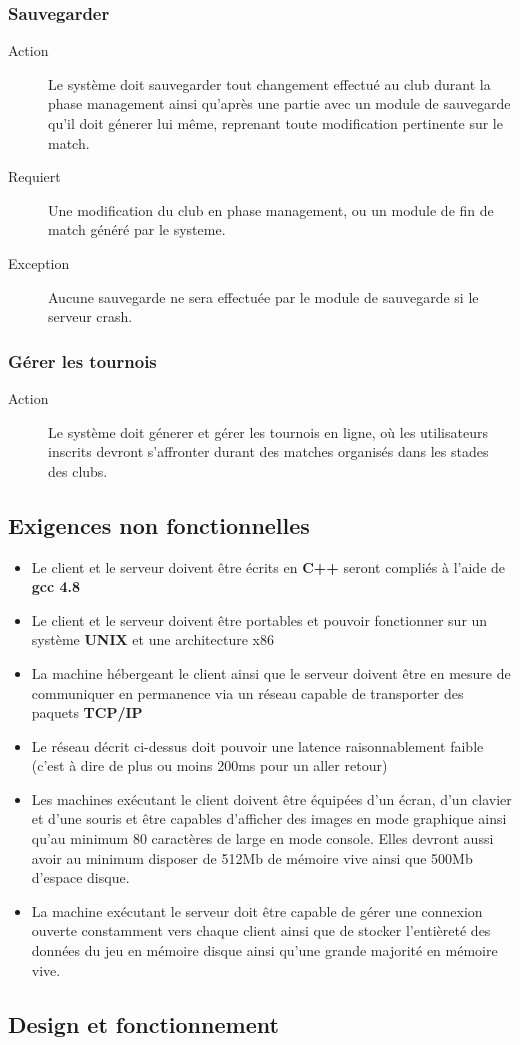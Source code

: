 \documentclass[a4paper]{article}
\begin{document}
\subsubsection{Sauvegarder}
\begin{description}
\item[Action] Le système doit sauvegarder tout changement effectué au \gls{club} durant la phase management ainsi qu'après une partie avec un module de sauvegarde qu'il doit génerer lui même, reprenant toute modification pertinente sur le match.
\item[Requiert] Une modification du club en phase management, ou un module de fin de match généré par le systeme. 
\item[Exception] Aucune sauvegarde ne sera effectuée par le module de sauvegarde si le serveur crash.
\end{description}

\subsubsection{Gérer les tournois}
\begin{description}
\item[Action] Le système doit génerer et gérer les tournois en ligne, où les utilisateurs inscrits devront s'affronter durant des matches organisés dans les stades des clubs.
\end{description}


\subsection{Exigences non fonctionnelles}
\label{enf}
\begin{itemize}
\item Le client et le serveur doivent être écrits en \textbf{C++} seront compliés à l'aide de \textbf{gcc 4.8}
\item Le client et le serveur doivent être portables et pouvoir fonctionner sur un système \textbf{UNIX} et une architecture x86
\item La machine hébergeant le client ainsi que le serveur doivent être en mesure de communiquer en permanence via un réseau capable de transporter des paquets \textbf{TCP/IP}
\item Le réseau décrit ci-dessus doit pouvoir une latence raisonnablement faible (c'est à dire de plus ou moins 200ms pour un aller retour)
\item Les machines exécutant le client doivent être équipées d'un écran, d'un clavier et d'une souris et être capables d'afficher des images en mode graphique ainsi qu'au minimum 80 caractères de large en mode console. Elles devront aussi avoir au minimum disposer de 512Mb de mémoire vive ainsi que 500Mb d'espace disque.
\item La machine exécutant le serveur doit être capable de gérer une connexion ouverte constamment vers chaque client ainsi que de stocker l'entièreté des données du jeu en mémoire disque ainsi qu'une grande majorité en mémoire vive.
\end{itemize}

\subsection{Design et fonctionnement}

\printindex
\tableofcontents
\listoffigures
\end{document}
